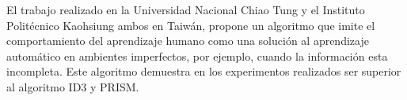 El trabajo realizado en la Universidad Nacional Chiao Tung y el Instituto
 Politécnico Kaohsiung ambos en Taiwán\cite{Chang1996}, propone un algoritmo
 que imite el comportamiento del aprendizaje humano como una solución al
 aprendizaje automático en ambientes imperfectos, por ejemplo, cuando la
 información esta incompleta. Este algoritmo demuestra en los experimentos
 realizados ser superior al algoritmo ID3 y PRISM.